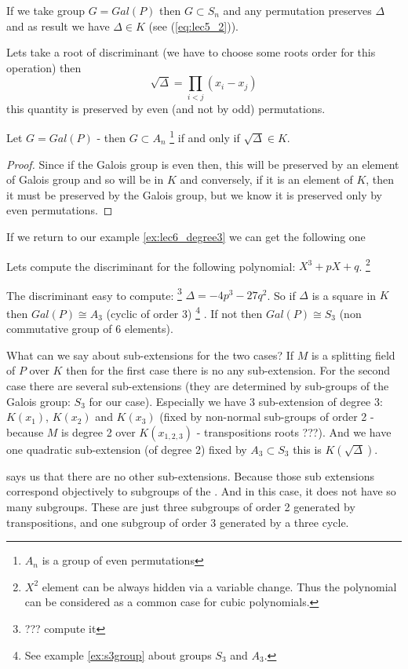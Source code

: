 If we take group $G = Gal\left(P\right)$ then
$G \subset S_n$ and any permutation preserves $\Delta$ and as result
we have $\Delta \in K$ (see (\ref{eq:lec5_2})).

Lets take a root of discriminant (we have to choose some roots order
for this operation) then
\[
\sqrt{\Delta} = \prod_{i < j} \left(x_i - x_j\right)
\]
this quantity is preserved by even (and not by odd) permutations.

\begin{proposition}
  Let $G = Gal\left(P\right)$ -  then $G
  \subset A_n$
  \footnote {
    $A_n$ is a group of even permutations
  }
  if and only if $\sqrt{\Delta} \in K$.
  \begin{proof}
    Since if the Galois group is even then, this will be preserved by
    an element of Galois group and so will be in $K$ and conversely, if
    it is an element of $K$, then it must be preserved by the Galois
    group, but we know it is preserved only by even permutations. 
  \end{proof}
  \label{prop:lec6_1}
\end{proposition}

If we return to our example \ref{ex:lec6_degree3} we can get the
following one
\begin{example}
  Lets compute the discriminant for the following polynomial:
  $X^3 + p X + q$.
  \footnote {
    $X^2$ element can be always hidden via a variable change. Thus the
    polynomial can be considered as a common case for cubic polynomials.
  }

  The discriminant easy to compute:
  \footnote{
    ??? compute it
  }
  \(
  \Delta = -4 p^3 - 27 q^2
  \).
  So if $\Delta$ is a square in $K$ then $Gal\left(P\right) \cong A_3$
  (cyclic of order 3)
  \footnote{
    See example \ref{ex:s3group} about groups $S_3$ and
     $A_3$.
  }
  . If not then $Gal\left(P\right) \cong S_3$ (non
  commutative group of 6 elements).

  What can we say about sub-extensions for the two cases? If $M$ is a
  splitting field of $P$ over $K$ then for the first case there is no
  any sub-extension. For the second case there are several
  sub-extensions (they are determined by sub-groups of the Galois
  group: $S_3$ for our case). Especially we have 3 sub-extension of
  degree 3: $K\left(x_1\right)$, $K\left(x_2\right)$ and
  $K\left(x_3\right)$ (fixed by non-normal sub-groups of order 2 -
  because $M$ is degree 2 over $K\left(x_{1,2,3}\right)$ -
  transpositions roots ???). And we have one quadratic sub-extension
  (of degree 2) fixed by $A_3 \subset S_3$ this is
  $K\left(\sqrt{\Delta}\right)$.

   says us that there are no other
  sub-extensions. Because those sub extensions correspond objectively
  to subgroups of the . And in this case, it
  does not have so many subgroups. These are just three subgroups of order 2
  generated by transpositions, and one subgroup of order 3 generated
  by a three cycle.  
  \label{ex:lec6_discriminant3degree}
\end{example}

